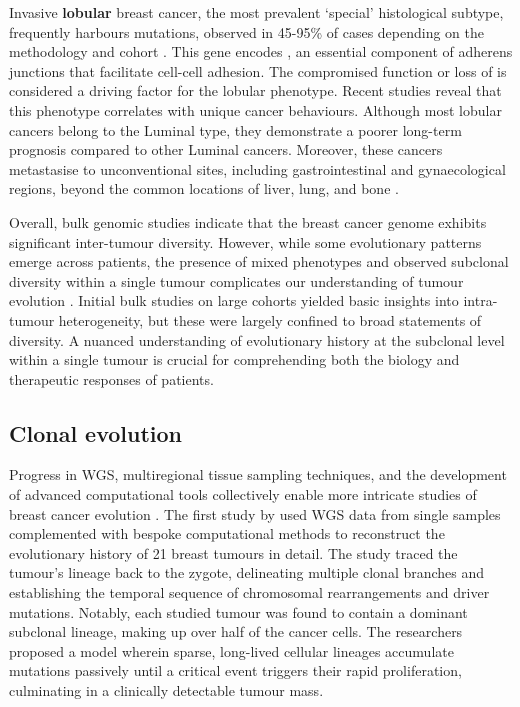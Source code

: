 Invasive \textbf{lobular} breast cancer, the most prevalent `special' histological subtype, frequently harbours  mutations, observed in 45-95\% of cases depending on the methodology and cohort \parencite{Ciriello2015-ey, McCart_Reed2021-aa}. This gene encodes , an essential component of adherens junctions that facilitate cell-cell adhesion. The compromised function or loss of  is considered a driving factor for the lobular phenotype. Recent studies reveal that this phenotype correlates with unique cancer behaviours. Although most lobular cancers belong to the Luminal type, they demonstrate a poorer long-term prognosis compared to other Luminal cancers. Moreover, these cancers metastasise to unconventional sites, including gastrointestinal and gynaecological regions, beyond the common locations of liver, lung, and bone \parencite{McCart_Reed2021-aa}.

Overall, bulk genomic studies indicate that the breast cancer genome exhibits significant inter-tumour diversity. However, while some evolutionary patterns emerge across patients, the presence of mixed phenotypes and observed subclonal diversity within a single tumour complicates our understanding of tumour evolution \parencite{Ciriello2015-ey,Pereira2016-ov,Shah2012-xz}. Initial bulk studies on large cohorts yielded basic insights into intra-tumour heterogeneity, but these were largely confined to broad statements of diversity. A nuanced understanding of evolutionary history at the subclonal level within a single tumour is crucial for comprehending both the biology and therapeutic responses of patients.

\subsection{Clonal evolution}

Progress in \ac{WGS}, multiregional tissue sampling techniques, and the development of advanced computational tools collectively enable more intricate studies of breast cancer evolution . The first study by \textcite{Nik-Zainal2012-zz} used \ac{WGS} data from single samples complemented with bespoke computational methods to reconstruct the evolutionary history of 21 breast tumours in detail. The study traced the tumour's lineage back to the zygote, delineating multiple clonal branches and establishing the temporal sequence of chromosomal rearrangements and driver mutations. Notably, each studied tumour was found to contain a dominant subclonal lineage, making up over half of the cancer cells. The researchers proposed a model wherein sparse, long-lived cellular lineages accumulate mutations passively until a critical event triggers their rapid proliferation, culminating in a clinically detectable tumour mass. 

